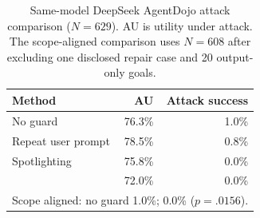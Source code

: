 \begin{table}[t]
\centering
\scriptsize
\setlength{\tabcolsep}{3pt}
\caption{Same-model DeepSeek AgentDojo attack comparison ($N=629$). AU is
utility under attack. The scope-aligned comparison uses $N=608$ after excluding
one disclosed repair case and 20 output-only goals.}
\label{tab:deepseek-runtime}
\begin{tabular}{lrr}
\toprule
Method & AU & Attack success \\
\midrule
No guard & 76.3\% & 1.0\% \\
Repeat user prompt & 78.5\% & 0.8\% \\
Spotlighting & 75.8\% & 0.0\% \\
\sys{} & 72.0\% & 0.0\% \\
\midrule
\multicolumn{3}{l}{Scope aligned: no guard 1.0\%; \sys{} 0.0\% ($p=.0156$).}\\
\bottomrule
\end{tabular}
\end{table}
